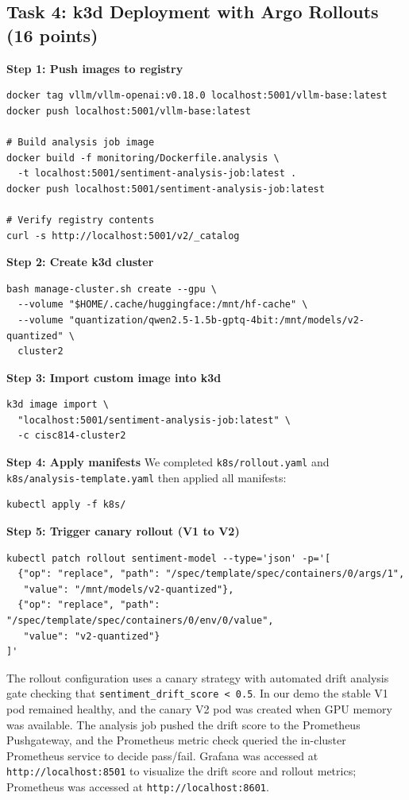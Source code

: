 \documentclass[11pt,a4paper]{article}
\begin{document}
\subsection{Task 4: k3d Deployment with Argo Rollouts (16 points)}

\textbf{Step 1: Push images to registry}
\begin{verbatim}
docker tag vllm/vllm-openai:v0.18.0 localhost:5001/vllm-base:latest
docker push localhost:5001/vllm-base:latest

# Build analysis job image
docker build -f monitoring/Dockerfile.analysis \
  -t localhost:5001/sentiment-analysis-job:latest .
docker push localhost:5001/sentiment-analysis-job:latest

# Verify registry contents
curl -s http://localhost:5001/v2/_catalog
\end{verbatim}

\textbf{Step 2: Create k3d cluster}
\begin{verbatim}
bash manage-cluster.sh create --gpu \
  --volume "$HOME/.cache/huggingface:/mnt/hf-cache" \
  --volume "quantization/qwen2.5-1.5b-gptq-4bit:/mnt/models/v2-quantized" \
  cluster2
\end{verbatim}

\textbf{Step 3: Import custom image into k3d}
\begin{verbatim}
k3d image import \
  "localhost:5001/sentiment-analysis-job:latest" \
  -c cisc814-cluster2
\end{verbatim}

\textbf{Step 4: Apply manifests}
We completed \texttt{k8s/rollout.yaml} and \texttt{k8s/analysis-template.yaml} then applied all manifests:
\begin{verbatim}
kubectl apply -f k8s/
\end{verbatim}

\textbf{Step 5: Trigger canary rollout (V1 to V2)}
\begin{verbatim}
kubectl patch rollout sentiment-model --type='json' -p='[
  {"op": "replace", "path": "/spec/template/spec/containers/0/args/1", 
   "value": "/mnt/models/v2-quantized"},
  {"op": "replace", "path": "/spec/template/spec/containers/0/env/0/value", 
   "value": "v2-quantized"}
]'
\end{verbatim}

The rollout configuration uses a canary strategy with automated drift analysis gate checking that \texttt{sentiment\_drift\_score < 0.5}. In our demo the stable V1 pod remained healthy, and the canary V2 pod was created when GPU memory was available. The analysis job pushed the drift score to the Prometheus Pushgateway, and the Prometheus metric check queried the in-cluster Prometheus service to decide pass/fail. Grafana was accessed at \texttt{http://localhost:8501} to visualize the drift score and rollout metrics; Prometheus was accessed at \texttt{http://localhost:8601}.
\end{document}
